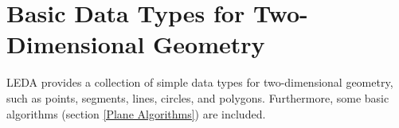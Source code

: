 \chapter{Basic Data Types for Two-Dimensional Geometry} 
\label{Basic Data Types for Two-Dimensional Geometry}

LEDA provides a collection of simple data types for two-dimensional geometry, 
such as points, segments, lines, circles, and polygons. 
Furthermore, some basic algorithms (section \ref{Plane Algorithms}) are 
included.


\newpage

\newpage

\newpage

\newpage

\newpage

\newpage

\newpage

\newpage

